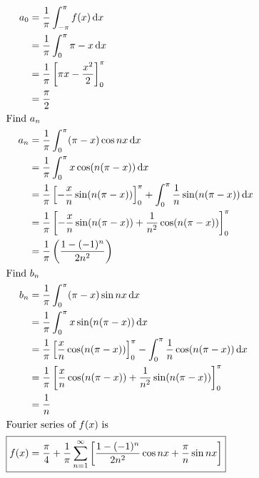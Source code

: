 \documentclass[12pt,final]{novelette} %
\begin{document}
\begin{question}[resume]
\begin{question}
        \vspace*{-1em}
        \begin{align*}
            a_0          & = \frac{1}{\pi} \int_{-\pi}^\pi f(x) \dd{x}                                                                              \\
                         & = \frac{1}{\pi} \int_0^\pi \pi - x \dd{x}                                                                                \\
                         & = \frac{1}{\pi} \left[\pi x - \frac{x^2}{2}\right]_0^\pi                                                                 \\
                         & = \frac{\pi}{2}                                                                                                          \\
            \intertext{Find $a_n$}
            a_n          & = \frac{1}{\pi} \int_0^\pi (\pi - x) \cos n x \dd{x}                                                                     \\
                         & = \frac{1}{\pi} \int_0^\pi x \cos(n(\pi - x)) \dd{x}                                                                     \\
                         & = \frac{1}{\pi} \left[-\frac x n \sin(n(\pi - x))\right]_0^\pi + \int_0^\pi \frac{1}{n} \sin(n(\pi-x)) \dd{x}            \\
                         & = \frac{1}{\pi} \left[-\frac x n \sin(n(\pi - x)) + \frac{1}{n^2} \cos(n(\pi - x))\right]_0^\pi                          \\
                         & = \frac{1}{\pi} \left(\frac{1-(-1)^n}{2n^2}\right)                                                                       \\
            \intertext{Find $b_n$}
            b_n          & = \frac{1}{\pi} \int_0^\pi (\pi - x) \sin n x \dd{x}                                                                     \\
                         & = \frac{1}{\pi} \int_0^\pi x \sin(n(\pi - x)) \dd{x}                                                                     \\
                         & = \frac{1}{\pi} \left[\frac x n \cos(n(\pi - x))\right]_0^\pi - \int_0^\pi \frac{1}{n} \cos(n(\pi-x)) \dd{x}             \\
                         & = \frac{1}{\pi} \left[\frac x n \cos(n(\pi - x)) + \frac{1}{n^2} \sin(n(\pi - x))\right]_0^\pi                           \\
                         & = \frac{1}{n}                                                                                                            \\
            \intertext{Fourier series of $f(x)$ is}
            \Aboxed{f(x) & = \frac{\pi}{4} + \frac{1}{\pi} \sum_{n=1}^\infty \left[ \frac{1-(-1)^n}{2n^2} \cos n x + \frac{\pi}{n} \sin n x\right]}
        \end{align*}


\end{question}
\end{question}
\end{document}
